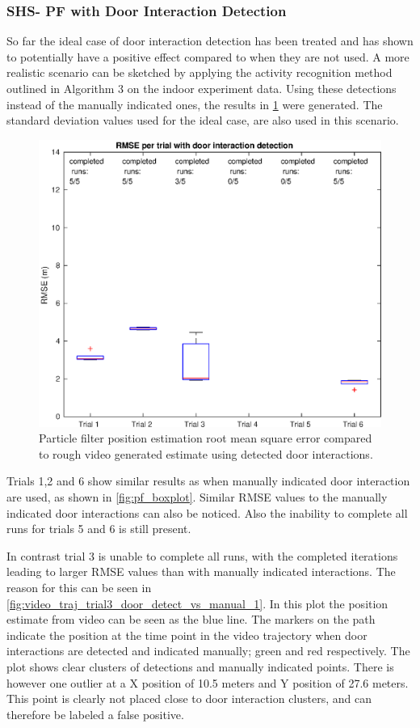 \subsubsection{SHS- PF with Door Interaction Detection}
So far the ideal case of door interaction detection has been treated and has shown to potentially have a positive effect compared to when they are not used. A more realistic scenario can be sketched by applying the activity recognition method outlined in Algorithm 3 on the indoor experiment data. Using these detections instead of the manually indicated ones, the results in \cref{fig:rmse_per_trial_with_activity_recognition} were generated. The standard deviation values used for the ideal case, are also used in this scenario.

\begin{figure}[H]
	\centering
	\includegraphics[width=0.7\linewidth]{images/20201201_1851_RMSE_per_trial_with_door_interaction_detection}
	\caption[Particle Filter position estimation performance with door interaction]{Particle filter position estimation root mean square error compared to rough video generated estimate using detected door interactions.}
	\label{fig:rmse_per_trial_with_activity_recognition}
\end{figure}

Trials 1,2 and 6 show similar results as when manually indicated door interaction are used, as shown in \cref{fig:pf_boxplot}. Similar RMSE values to the manually indicated door interactions can also be noticed. Also the inability to complete all runs for trials 5 and 6 is still present. \par 

In contrast trial 3 is unable to complete all runs, with the completed iterations leading to larger RMSE values than with manually indicated interactions. The reason for this can be seen in \cref{fig:video_traj_trial3_door_detect_vs_manual_1}. In this plot the position estimate from video can be seen as the blue line. The markers on the path indicate the position at the time point in the video trajectory when door interactions are detected and indicated manually; green and red respectively. The plot shows clear clusters of detections and manually indicated points. There is however one outlier at a X position of 10.5 meters and Y position of 27.6 meters. This point is clearly not placed close to door interaction clusters, and can therefore be labeled a false positive. \par 

